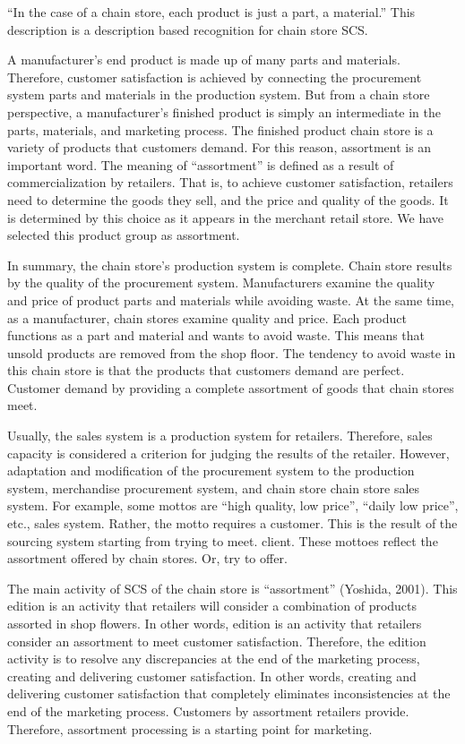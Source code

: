 \documentclass[]{article}
\begin{document}
``In the case of a chain store, each product is just a part, a
material.'' This description is a description based recognition for
chain store SCS.

A manufacturer's end product is made up of many parts and materials.
Therefore, customer satisfaction is achieved by connecting the
procurement system parts and materials in the production system. But
from a chain store perspective, a manufacturer's finished product is
simply an intermediate in the parts, materials, and marketing process.
The finished product chain store is a variety of products that customers
demand. For this reason, assortment is an important word. The meaning of
``assortment'' is defined as a result of commercialization by retailers.
That is, to achieve customer satisfaction, retailers need to determine
the goods they sell, and the price and quality of the goods. It is
determined by this choice as it appears in the merchant retail store. We
have selected this product group as assortment.

In summary, the chain store's production system is complete. Chain store
results by the quality of the procurement system. Manufacturers examine
the quality and price of product parts and materials while avoiding
waste. At the same time, as a manufacturer, chain stores examine quality
and price. Each product functions as a part and material and wants to
avoid waste. This means that unsold products are removed from the shop
floor. The tendency to avoid waste in this chain store is that the
products that customers demand are perfect. Customer demand by providing
a complete assortment of goods that chain stores meet.

Usually, the sales system is a production system for retailers.
Therefore, sales capacity is considered a criterion for judging the
results of the retailer. However, adaptation and modification of the
procurement system to the production system, merchandise procurement
system, and chain store chain store sales system. For example, some
mottos are ``high quality, low price'', ``daily low price'', etc., sales
system. Rather, the motto requires a customer. This is the result of the
sourcing system starting from trying to meet. client. These mottoes
reflect the assortment offered by chain stores. Or, try to offer.

The main activity of SCS of the chain store is ``assortment'' (Yoshida,
2001). This edition is an activity that retailers will consider a
combination of products assorted in shop flowers. In other words,
edition is an activity that retailers consider an assortment to meet
customer satisfaction. Therefore, the edition activity is to resolve any
discrepancies at the end of the marketing process, creating and
delivering customer satisfaction. In other words, creating and
delivering customer satisfaction that completely eliminates
inconsistencies at the end of the marketing process. Customers by
assortment retailers provide. Therefore, assortment processing is a
starting point for marketing.
\end{document}
